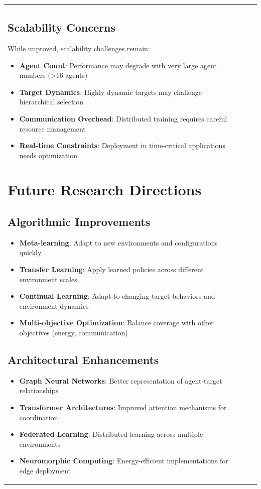 \documentclass[12pt,a4paper]{report}
\begin{document}
\begin{table}[H]
\begin{table}[H]
\begin{tabular}{lccc}
\begin{table}[H]
\begin{table}[H]
\subsection{Scalability Concerns}
While improved, scalability challenges remain:

\begin{itemize}
\item \textbf{Agent Count}: Performance may degrade with very large agent numbers (>16 agents)
\item \textbf{Target Dynamics}: Highly dynamic targets may challenge hierarchical selection
\item \textbf{Communication Overhead}: Distributed training requires careful resource management
\item \textbf{Real-time Constraints}: Deployment in time-critical applications needs optimization
\end{itemize}

\section{Future Research Directions}

\subsection{Algorithmic Improvements}
\begin{itemize}
\item \textbf{Meta-learning}: Adapt to new environments and configurations quickly
\item \textbf{Transfer Learning}: Apply learned policies across different environment scales
\item \textbf{Continual Learning}: Adapt to changing target behaviors and environment dynamics
\item \textbf{Multi-objective Optimization}: Balance coverage with other objectives (energy, communication)
\end{itemize}

\subsection{Architectural Enhancements}
\begin{itemize}
\item \textbf{Graph Neural Networks}: Better representation of agent-target relationships
\item \textbf{Transformer Architectures}: Improved attention mechanisms for coordination
\item \textbf{Federated Learning}: Distributed learning across multiple environments
\item \textbf{Neuromorphic Computing}: Energy-efficient implementations for edge deployment
\end{itemize}


\end{table}
\end{table}
\end{tabular}
\end{table}
\end{table}
\end{document}
